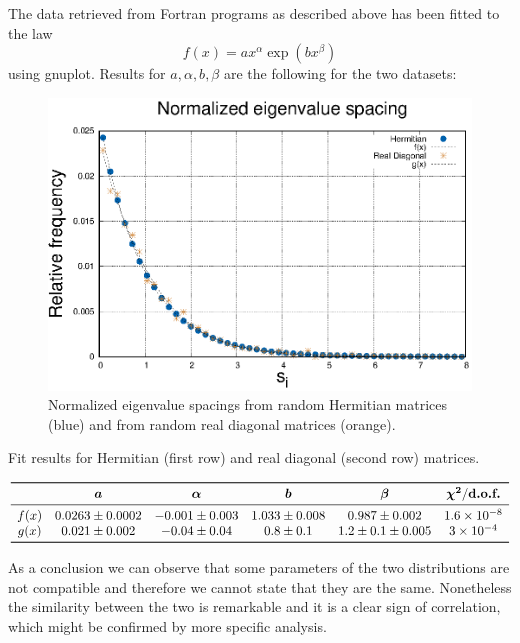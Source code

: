 \documentclass[a4paper]{article}
\begin{document}
The data retrieved from Fortran programs as described above has been fitted to the law \[f(x)=ax^\alpha \exp(bx^\beta)\]
using gnuplot.
Results for $a,\alpha,b, \beta$ are the following for the two datasets:

\begin{figure}
\centering
\includegraphics[width=\textwidth]{Hist_2000_0450.eps}
\caption{Normalized eigenvalue spacings from random Hermitian matrices (blue) and from random real diagonal matrices (orange).}
\label{fig:histofit}
\end{figure}

\begin{table}[h]
\centering
\caption{Fit results for Hermitian (first row) and real diagonal (second row) matrices.}
\label{tab:mu_lit}
\begin{minipage}{16cm}
\[
\begin{array}{cccccc}
\toprule    

 &\bm{a} & \bm{\alpha} & \bm{b} & \bm{\beta} & \bm{\chi^2}/\textbf{d.o.f.}\\
\midrule
f(x) & 0.0263 \pm 0.0002 &   -0.001\pm 0.003 & 1.033 \pm 0.008 & 0.987 \pm 0.002 &1.6\times 10^{-8}\\
g(x) & 0.021\pm  0.002  &   -0.04 \pm 0.04  & 0.8 \pm 0.1 &  1.2 \pm 0.1 \pm 0.005 & 3\times10^{-4}\\

\bottomrule                                                 
\end{array}
\]
\end{minipage}
\end{table}
As a conclusion we can observe that some parameters of the two distributions are not compatible and therefore we cannot state that they are the same.
Nonetheless the similarity between the two is remarkable and it is a clear sign of correlation, which might be confirmed by more specific analysis.
\end{document}
